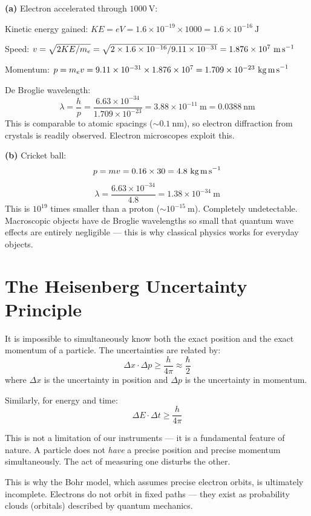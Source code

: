 \begin{solutionbox}
\textbf{(a)} Electron accelerated through $1000\ \text{V}$:

Kinetic energy gained: $KE = eV = 1.6\times10^{-19}
\times 1000 = 1.6\times10^{-16}\ \text{J}$

Speed: $v = \sqrt{2KE/m_e} = \sqrt{2 \times 1.6\times10^{-16}
/ 9.11\times10^{-31}} = 1.876\times10^7\ \text{m\,s}^{-1}$

Momentum: $p = m_e v = 9.11\times10^{-31}
\times 1.876\times10^7 = 1.709\times10^{-23}\ \text{kg\,m\,s}^{-1}$

De Broglie wavelength:
\[
  \lambda = \frac{h}{p}
  = \frac{6.63\times10^{-34}}{1.709\times10^{-23}}
  = 3.88\times10^{-11}\ \text{m} = 0.0388\ \text{nm}
\]
This is comparable to atomic spacings ($\sim 0.1\ \text{nm}$),
so electron diffraction from crystals is readily
observed. Electron microscopes exploit this.

\textbf{(b)} Cricket ball:
\[
  p = mv = 0.16 \times 30 = 4.8\ \text{kg\,m\,s}^{-1}
\]
\[
  \lambda = \frac{6.63\times10^{-34}}{4.8}
  = 1.38\times10^{-34}\ \text{m}
\]
This is $10^{19}$ times smaller than a proton
($\sim 10^{-15}\ \text{m}$). Completely undetectable.
Macroscopic objects have de Broglie wavelengths so
small that quantum wave effects are entirely
negligible --- this is why classical physics works
for everyday objects.
\end{solutionbox}

\section{The Heisenberg Uncertainty Principle}

\begin{lawbox}
It is impossible to simultaneously know both the
exact position and the exact momentum of a particle.
The uncertainties are related by:
\[
  \Delta x \cdot \Delta p \geq \frac{h}{4\pi}
  \approx \frac{\hbar}{2}
\]
where $\Delta x$ is the uncertainty in position and
$\Delta p$ is the uncertainty in momentum.

Similarly, for energy and time:
\[
  \Delta E \cdot \Delta t \geq \frac{h}{4\pi}
\]

This is not a limitation of our instruments ---
it is a fundamental feature of nature. A particle
does not \textit{have} a precise position and precise
momentum simultaneously. The act of measuring one
disturbs the other.

This is why the Bohr model, which assumes precise
electron orbits, is ultimately incomplete. Electrons
do not orbit in fixed paths --- they exist as
probability clouds (orbitals) described by quantum
mechanics.
\end{lawbox}

